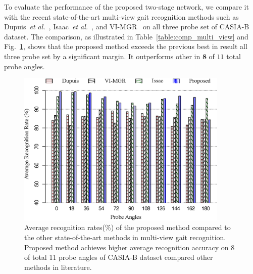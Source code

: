 To evaluate the performance of the proposed two-stage network, we compare it with the recent state-of-the-art multi-view gait recognition methods such as Dupuis~\textit{et al.}~\cite{Dupuis_13}, Isaac~\textit{et al.}~\cite{Isaac_17}, and VI-MGR~\cite{Choudhury_15} on all three probe set of CASIA-B dataset. The comparison, as illustrated in Table~\ref{table:comp_multi_view} and Fig.~\ref{fig:comp_casia_b_multi_view}, shows that the proposed method exceeds the previous best in result all three probe set by a significant margin. It outperforms other in $ \textbf{8} $ of $ 11 $ total probe angles.

\begin{figure}
	\centering
	\includegraphics[width= 0.9\textwidth]{figures/comp_casia_b_multi_view.eps}
	\caption [Average recognition rates(\%) of the proposed method compared to the other state-of-the-art methods in 	multi-view gait recognition]{
		Average recognition rates(\%) of the proposed method compared to the other state-of-the-art methods in multi-view gait recognition. Proposed method achieves higher average recognition accuracy on 8 of total 11 probe angles of CASIA-B dataset compared other methods in literature. \label{fig:comp_casia_b_multi_view}
	}

\end{figure}

